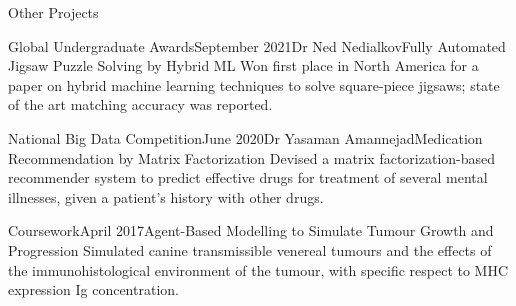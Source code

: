 \begin{rSection}{Other Projects}

\begin{rSubsection}{Global Undergraduate Awards}{September 2021}{Dr Ned Nedialkov}{Fully Automated Jigsaw Puzzle Solving by Hybrid ML}
	Won first place in North America for a paper on hybrid machine learning techniques to solve square-piece jigsaws; state of the art matching accuracy was reported.
\end{rSubsection}

\begin{rSubsection}{National Big Data Competition}{June 2020}{Dr Yasaman Amannejad}{Medication Recommendation by Matrix Factorization}
	Devised a matrix factorization-based recommender system to predict effective drugs for treatment of several mental illnesses, given a patient's history with other drugs.
\end{rSubsection}

\begin{rSubsection}{Coursework}{April 2017}{}{Agent-Based Modelling to Simulate Tumour Growth and Progression}
	Simulated canine transmissible venereal tumours and the effects of the immunohistological environment of the tumour, with specific respect to MHC expression Ig concentration.
\end{rSubsection}





\end{rSection}
